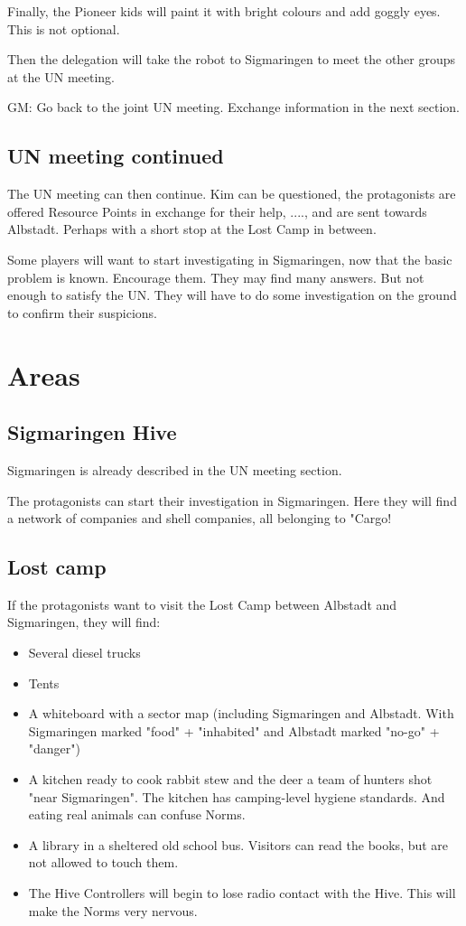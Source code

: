 Finally, the Pioneer kids will paint it with bright colours and add goggly eyes. This is not optional.

Then the delegation will take the robot to Sigmaringen to meet the other groups at the UN meeting.

GM: Go back to the joint UN meeting. Exchange information in the next section.

\subsection{UN meeting continued}

The UN meeting can then continue. Kim can be questioned, the protagonists are offered Resource Points in exchange for their help, ...., and are sent towards Albstadt. Perhaps with a short stop at the Lost Camp in between.

Some players will want to start investigating in Sigmaringen, now that the basic problem is known. Encourage them. They may find many answers. But not enough to satisfy the UN. They will have to do some investigation on the ground to confirm their suspicions.

\section{Areas}

\subsection{Sigmaringen Hive}

Sigmaringen is already described in the UN meeting section.

The protagonists can start their investigation in Sigmaringen. Here they will find a network of companies and shell companies, all belonging to "Cargo!

\subsection{Lost camp}

If the protagonists want to visit the Lost Camp between Albstadt and Sigmaringen, they will find:

\begin{itemize}
    \item Several diesel trucks
    \item Tents
    \item A whiteboard with a sector map (including Sigmaringen and Albstadt. With Sigmaringen marked "food" + "inhabited" and Albstadt marked "no-go" + "danger")
    \item A kitchen ready to cook rabbit stew and the deer a team of hunters shot "near Sigmaringen". The kitchen has camping-level hygiene standards. And eating real animals can confuse Norms.
    \item A library in a sheltered old school bus. Visitors can read the books, but are not allowed to touch them.
    \item The Hive Controllers will begin to lose radio contact with the Hive. This will make the Norms very nervous.
\end{itemize}

